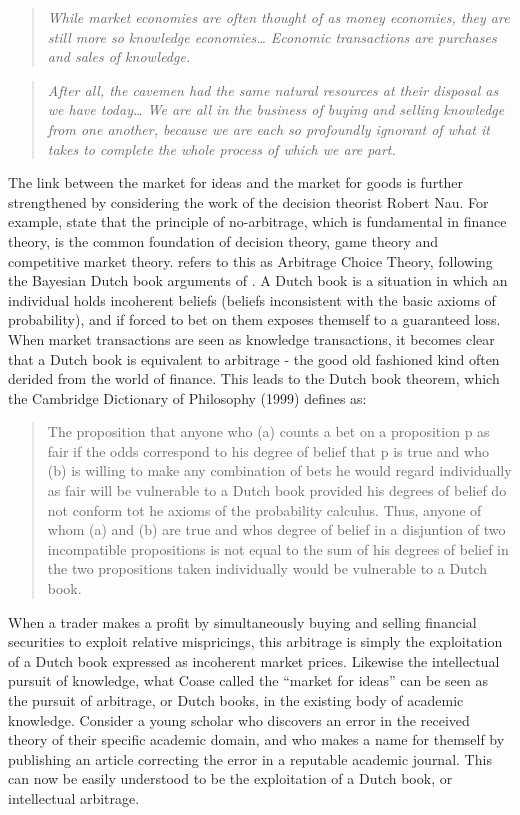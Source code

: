 \documentclass[11pt,]{article}
\begin{document}
\begin{quote}
\emph{While market economies are often thought of as money economies,
they are still more so knowledge economies\ldots{} Economic transactions
are purchases and sales of knowledge.}
\end{quote}

\begin{quote}
\emph{After all, the cavemen had the same natural resources at their
disposal as we have today\ldots{} We are all in the business of buying
and selling knowledge from one another, because we are each so
profoundly ignorant of what it takes to complete the whole process of
which we are part.}
\end{quote}

The link between the market for ideas and the market for goods is
further strengthened by considering the work of the decision theorist
Robert Nau. For example, \citet{NauMcCardle1991} state that the
principle of no-arbitrage, which is fundamental in finance theory, is
the common foundation of decision theory, game theory and competitive
market theory. \citet{Nau1999} refers to this as Arbitrage Choice
Theory, following the Bayesian Dutch book arguments of
\citet{deFinetti1937}. A Dutch book is a situation in which an
individual holds incoherent beliefs (beliefs inconsistent with the basic
axioms of probability), and if forced to bet on them exposes themself to
a guaranteed loss. When market transactions are seen as knowledge
transactions, it becomes clear that a Dutch book is equivalent to
arbitrage - the good old fashioned kind often derided from the world of
finance. This leads to the Dutch book theorem, which the Cambridge
Dictionary of Philosophy (1999) defines as:

\begin{quote}
The proposition that anyone who (a) counts a bet on a proposition p as
fair if the odds correspond to his degree of belief that p is true and
who (b) is willing to make any combination of bets he would regard
individually as fair will be vulnerable to a Dutch book provided his
degrees of belief do not conform tot he axioms of the probability
calculus. Thus, anyone of whom (a) and (b) are true and whos degree of
belief in a disjuntion of two incompatible propositions is not equal to
the sum of his degrees of belief in the two propositions taken
individually would be vulnerable to a Dutch book.
\end{quote}

When a trader makes a profit by simultaneously buying and selling
financial securities to exploit relative mispricings, this arbitrage is
simply the exploitation of a Dutch book expressed as incoherent market
prices. Likewise the intellectual pursuit of knowledge, what Coase
called the ``market for ideas'' can be seen as the pursuit of arbitrage,
or Dutch books, in the existing body of academic knowledge. Consider a
young scholar who discovers an error in the received theory of their
specific academic domain, and who makes a name for themself by
publishing an article correcting the error in a reputable academic
journal. This can now be easily understood to be the exploitation of a
Dutch book, or intellectual arbitrage.
\end{document}
